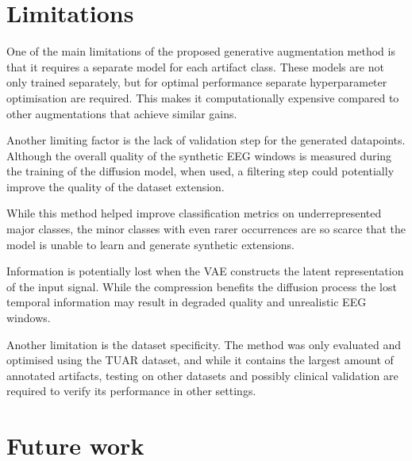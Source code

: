 \section{Limitations}

One of the main limitations of the proposed generative augmentation method is that it requires a separate model for each artifact class. These models are not only trained separately, but for optimal performance separate hyperparameter optimisation are required. This makes it computationally expensive compared to other augmentations that achieve similar gains. 

Another limiting factor is the lack of validation step for the generated datapoints. Although the overall quality of the synthetic EEG windows is measured during the training of the diffusion model, when used, a filtering step could potentially improve the quality of the dataset extension.

While this method helped improve classification metrics on underrepresented major classes, the minor classes with even rarer occurrences are so scarce that the model is unable to learn and generate synthetic extensions. 

Information is potentially lost when the VAE constructs the latent representation of the input signal. While the compression benefits the diffusion process the lost temporal information may result in degraded quality and unrealistic EEG windows.

Another limitation is the dataset specificity. The method was only evaluated and optimised using the TUAR dataset, and while it contains the largest amount of annotated artifacts, testing on other datasets and possibly clinical validation are required to verify its performance in other settings.

\section{Future work}

